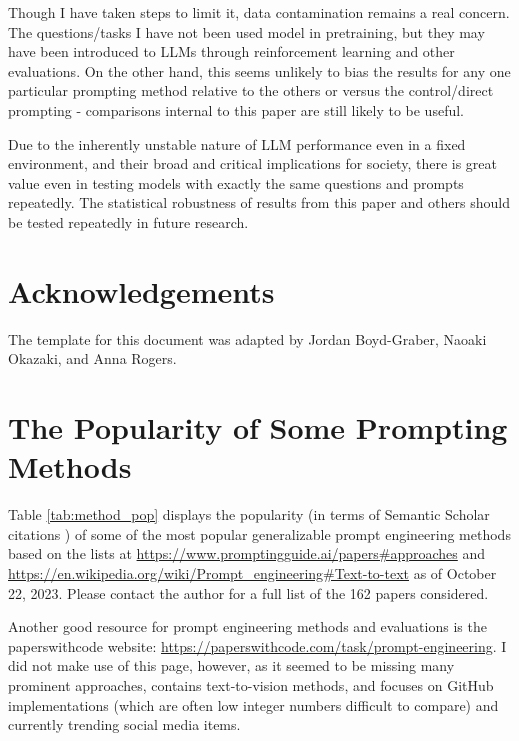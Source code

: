 \documentclass[11pt]{article}
\begin{document}
Though I have taken steps to limit it, data contamination remains a real concern. The questions/tasks I have not been used model in pretraining, but they may have been introduced to LLMs through reinforcement learning and other evaluations. On the other hand, this seems unlikely to bias the results for any one particular prompting method relative to the others or versus the control/direct prompting - comparisons internal to this paper are still likely to be useful.

Due to the inherently unstable nature of LLM performance even in a fixed environment, and their broad and critical implications for society, there is great value even in testing models with exactly the same questions and prompts repeatedly. The statistical robustness of results from this paper and others should be tested repeatedly in future research.

\section*{Acknowledgements}
The template for this document was adapted by Jordan Boyd-Graber, Naoaki Okazaki, and Anna Rogers.




\clearpage
\newpage

\onecolumn
\setlength{\parindent}{0cm}
\setlength\parskip{1em plus 0.1em minus 0.2em}
\appendix

\section{The Popularity of Some Prompting Methods}
\label{sec:popularity}

Table \ref{tab:method_pop} displays the popularity (in terms of Semantic Scholar citations \cite{noauthor_semantic_nodate}) of some of the most popular generalizable prompt engineering methods based on the lists at \url{https://www.promptingguide.ai/papers#approaches} and \url{https://en.wikipedia.org/wiki/Prompt_engineering#Text-to-text} as of October 22, 2023. Please contact the author for a full list of the 162 papers considered.

Another good resource for prompt engineering methods and evaluations is the paperswithcode website: \url{https://paperswithcode.com/task/prompt-engineering}. I did not make use of this page, however, as it seemed to be missing many prominent approaches, contains text-to-vision methods, and focuses on GitHub implementations (which are often low integer numbers difficult to compare) and currently trending social media items.
\end{document}
